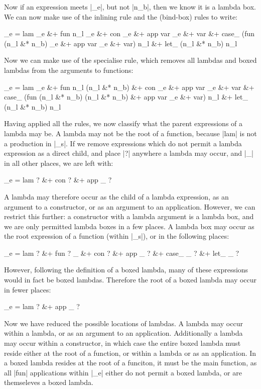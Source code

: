 \documentclass[preprint]{sigplanconf}
\begin{document}
Now if an expression meets |_e|, but not |n_b|, then we know it is a lambda box. We can now make use of the inlining rule and the (bind-box) rules to write:

\begin{code}
_e =  lam _e &+ fun n_l _e &+ con _e &+ app var _e &+ var &+
      case_ (fun (n_l &* n_b) _e &+ app var _e &+ var) n_l &+ let_ (n_l &* n_b) n_l
\end{code}

Now we can make use of the specialise rule, which removes all lambdas and boxed lambdas from the arguments to functions:

\begin{code}
_e =  lam _e &+ fun n_l (n_l &* n_b) &+ con _e &+ app var _e &+ var &+
      case_ (fun (n_l &* n_b) (n_l &* n_b) &+ app var _e &+ var) n_l &+ let_ (n_l &* n_b) n_l
\end{code}

Having applied all the rules, we now classify what the parent expressions of a lambda may be. A lambda may not be the root of a function, because |lam| is not a production in |_s|. If we remove expressions which do not permit a lambda expression as a direct child, and place |?| anywhere a lambda may occur, and |_| in all other places, we are left with:

\begin{code}
_e =  lam ? &+ con ? &+ app _ ?
\end{code}

A lambda may therefore occur as the child of a lambda expression, as an argument to a constructor, or as an argument to an application. However, we can restrict this further: a constructor with a lambda argument is a lambda box, and we are only permitted lambda boxes in a few places. A lambda box may occur as the root expression of a function (within |_s|), or in the following places:

\begin{code}
_e =  lam ? &+ fun ? _ &+ con ? &+ app _ ? &+ case_ _ ? &+ let_ _ ?
\end{code}

However, following the definition of a boxed lambda, many of these expressions would in fact be boxed lambdas. Therefore the root of a boxed lambda may occur in fewer places:

\begin{code}
_e =  lam ? &+ app _ ?
\end{code}

Now we have reduced the possible locations of lambdas. A lambda may occur within a lambda, or as an argument to an application. Additionally a lambda may occur within a constructor, in which case the entire boxed lambda must reside either at the root of a function, or within a lambda or as an application. In a boxed lambda resides at the root of a funciton, it must be the main function, as all |fun| applications within |_e| either do not permit a boxed lambda, or are themseleves a boxed lambda.
\end{document}
